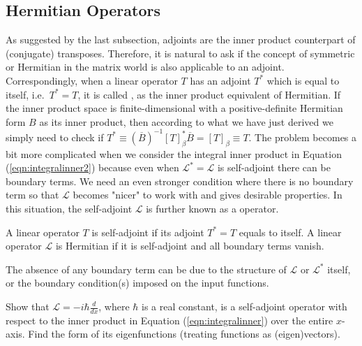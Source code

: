 \subsection{Hermitian Operators}
As suggested by the last subsection, adjoints are the inner product counterpart of (conjugate) transposes. Therefore, it is natural to ask if the concept of symmetric or Hermitian in the matrix world is also applicable to an adjoint. Correspondingly, when a linear operator $T$ has an adjoint $T^*$ which is equal to itself, i.e.\ $T^* = T$, it is called , as the inner product equivalent of Hermitian. If the inner product space is finite-dimensional with a positive-definite Hermitian form $B$ as its inner product, then according to what we have just derived we simply need to check if $T^* \equiv (\overline{B})^{-1} [T]_\beta^* \overline{B} = [T]_\beta \equiv T$. The problem becomes a bit more complicated when we consider the integral inner product in Equation (\ref{eqn:integralinner2}) because even when $\mathcal{L}^* = \mathcal{L}$ is self-adjoint there can be boundary terms. We need an even stronger condition where there is no boundary term so that $\mathcal{L}$ becomes "nicer" to work with and gives desirable properties. In this situation, the self-adjoint $\mathcal{L}$ is further known as a  operator.
\begin{defn}
\label{defn:selfadjoint}
A linear operator $T$ is self-adjoint if its adjoint $T^* = T$ equals to itself. A linear operator $\mathcal{L}$ is Hermitian if it is self-adjoint and all boundary terms vanish.
\end{defn}
The absence of any boundary term can be due to the structure of $\mathcal{L}$ or $\mathcal{L}^*$ itself, or the boundary condition(s) imposed on the input functions. 
\begin{exmp}
Show that $\mathcal{L} = -i \hbar\frac{d}{dx}$, where $\hbar$ is a real constant, is a self-adjoint operator with respect to the inner product in Equation (\ref{eqn:integralinner}) over the entire $x$-axis. Find the form of its eigenfunctions (treating functions as (eigen)vectors).
\end{exmp}
